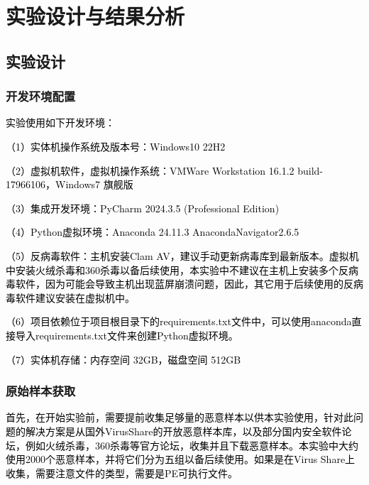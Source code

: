 
\chapter{实验设计与结果分析}

\section{实验设计}

\subsection{开发环境配置}

\textcolor{black}{实验使用如下开发环境：}

\textcolor{black}{（1）实体机操作系统及版本号：Windows10 22H2}

\textcolor{black}{（2）虚拟机软件，虚拟机操作系统：VMWare Workstation 16.1.2 build-17966106，Windows7 旗舰版
}

\textcolor{black}{（3）集成开发环境：PyCharm 2024.3.5 (Professional Edition) }

\textcolor{black}{（4）Python虚拟环境：Anaconda 24.11.3 AnacondaNavigator2.6.5 }

\textcolor{black}{（5）反病毒软件：主机安装Clam AV，建议手动更新病毒库到最新版本。虚拟机中安装火绒杀毒和360杀毒以备后续使用，本实验中不建议在主机上安装多个反病毒软件，因为可能会导致主机出现蓝屏崩溃问题，因此，其它用于后续使用的反病毒软件建议安装在虚拟机中。}

\textcolor{black}{（6）项目依赖位于项目根目录下的requirements.txt文件中，可以使用anaconda直接导入requirements.txt文件来创建Python虚拟环境。}

\textcolor{black}{（7）实体机存储：内存空间 32GB，磁盘空间 512GB}

\subsection{原始样本获取}

\textcolor{black}{首先，在开始实验前，需要提前收集足够量的恶意样本以供本实验使用，针对此问题的解决方案是从国外VirusShare的开放恶意样本库，以及部分国内安全软件论坛，例如火绒杀毒，360杀毒等官方论坛，收集并且下载恶意样本。本实验中大约使用2000个恶意样本，并将它们分为五组以备后续使用。如果是在Virus Share上收集，需要注意文件的类型，需要是PE可执行文件。}

